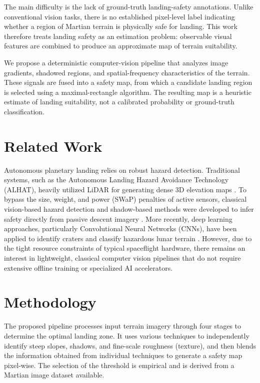 \documentclass{article}
\begin{document}
The main difficulty is the lack of ground-truth landing-safety annotations. Unlike conventional vision tasks, there is no established pixel-level label indicating whether a region of Martian terrain is physically safe for landing. This work therefore treats landing safety as an estimation problem: observable visual features are combined to produce an approximate map of terrain suitability.

We propose a deterministic computer-vision pipeline that analyzes image gradients, shadowed regions, and spatial-frequency characteristics of the terrain. These signals are fused into a safety map, from which a candidate landing region is selected using a maximal-rectangle algorithm. The resulting map is a heuristic estimate of landing suitability, not a calibrated probability or ground-truth classification.

\section{Related Work}
Autonomous planetary landing relies on robust hazard detection. Traditional systems, such as the Autonomous Landing Hazard Avoidance Technology (ALHAT), heavily utilized LiDAR for generating dense 3D elevation maps \cite{amzajerdian2013alhat}. To bypass the size, weight, and power (SWaP) penalties of active sensors, classical vision-based hazard detection and shadow-based methods were developed to infer safety directly from passive descent imagery \cite{restrepo2020next}. More recently, deep learning approaches, particularly Convolutional Neural Networks (CNNs), have been applied to identify craters and classify hazardous lunar terrain \cite{moghe2020deep}. However, due to the tight resource constraints of typical spaceflight hardware, there remains an interest in lightweight, classical computer vision pipelines that do not require extensive offline training or specialized AI accelerators.

\section{Methodology}
\label{sec:headings}
The proposed pipeline processes input terrain imagery through four stages to determine the optimal landing zone. It uses various techniques to independently identify steep slopes, shadows, and fine-scale roughness (texture), and then blends the information obtained from
individual techniques to generate a safety map pixel-wise. The
selection of the threshold is empirical and is derived from a
Martian image dataset available.
\end{document}
